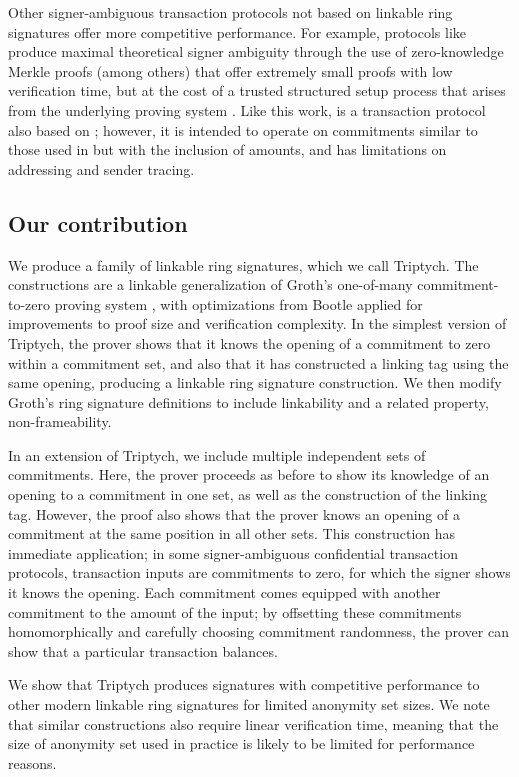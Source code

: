 \documentclass{article}
\theoremstyle{definition}
\begin{document}
Other signer-ambiguous transaction protocols not based on linkable ring signatures offer more competitive performance.
For example, protocols like \cite{zcash} produce maximal theoretical signer ambiguity through the use of zero-knowledge Merkle proofs (among others) that offer extremely small proofs with low verification time, but at the cost of a trusted structured setup process that arises from the underlying proving system \cite{groth16}.
Like this work, \cite{lelantus} is a transaction protocol also based on \cite{groth}; however, it is intended to operate on commitments similar to those used in \cite{zerocoin} but with the inclusion of amounts, and has limitations on addressing and sender tracing.


\subsection{Our contribution}
We produce a family of linkable ring signatures, which we call Triptych.
The constructions are a linkable generalization of Groth's one-of-many commitment-to-zero proving system \cite{groth}, with optimizations from Bootle \cite{bootle} applied for improvements to proof size and verification complexity.
In the simplest version of Triptych, the prover shows that it knows the opening of a commitment to zero within a commitment set, and also that it has constructed a linking tag using the same opening, producing a linkable ring signature construction.
We then modify Groth's ring signature definitions to include linkability and a related property, non-frameability.

In an extension of Triptych, we include multiple independent sets of commitments.
Here, the prover proceeds as before to show its knowledge of an opening to a commitment in one set, as well as the construction of the linking tag.
However, the proof also shows that the prover knows an opening of a commitment at the same position in all other sets.
This construction has immediate application; in some signer-ambiguous confidential transaction protocols, transaction inputs are commitments to zero, for which the signer shows it knows the opening.
Each commitment comes equipped with another commitment to the amount of the input; by offsetting these commitments homomorphically and carefully choosing commitment randomness, the prover can show that a particular transaction balances.

We show that Triptych produces signatures with competitive performance to other modern linkable ring signatures for limited anonymity set sizes.
We note that similar constructions also require linear verification time, meaning that the size of anonymity set used in practice is likely to be limited for performance reasons.
\end{document}
